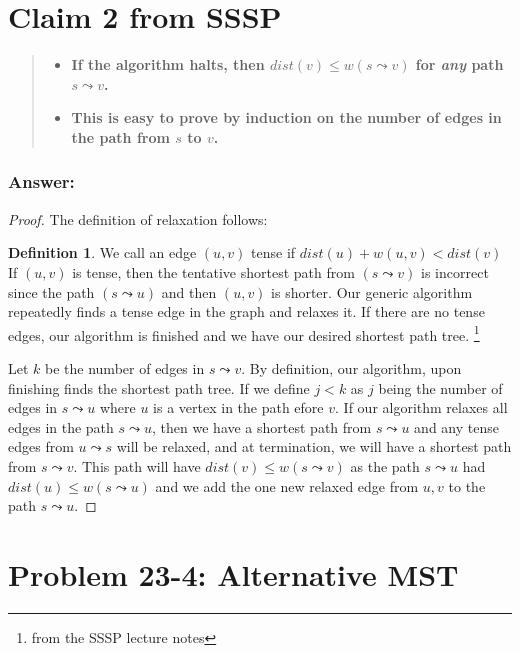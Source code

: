 \documentclass[titlepage]{article}
\theoremstyle{definition}
\newtheorem{definition}{Definition}[section]
\begin{document}
\section{Claim 2 from SSSP}
\begin{quote}
\begin{itemize}
  \item \textbf{ If the algorithm halts, then $dist(v) \leq w(s \leadsto v)$
	  for \emph{any} path $s \leadsto v$.}
  \item \textbf{This is easy to prove by induction on the number of edges in
	the path from $s$ to $v$.}
\end{itemize}
\end{quote}
\subsubsection{Answer:}

\begin{proof}
  The definition of relaxation follows:
  \begin{definition}
    We call an edge $(u, v)$ tense if $dist(u) + w(u, v) < dist(v)$ If $(u, v)$
    is tense, then the tentative shortest path from $(s \leadsto v )$ is
    incorrect since the path $(s \leadsto u)$ and then $(u, v)$ is shorter. Our
    generic algorithm repeatedly finds a tense edge in the graph and relaxes
    it. If there are no tense edges, our algorithm is finished and we have our
    desired shortest path tree. \footnote{from the SSSP lecture notes}
  \end{definition}

  Let $k$ be the number of edges in $s \leadsto v$. By definition, our
  algorithm, upon finishing finds the shortest path tree. If we define $j < k$
  as $j$ being the number of edges in $s \leadsto u$ where $u$ is a vertex in
  the path efore $v$. If our algorithm relaxes all edges in the path $s
  \leadsto u$, then we have a shortest path from $s \leadsto u$ and any tense
  edges from $u \leadsto s$ will be relaxed, and at termination, we will have a
  shortest path from $s \leadsto v$. This path will have $dist(v) \leq w(s
  \leadsto v)$ as the path $s \leadsto u$ had $dist(u) \leq w(s \leadsto u)$
  and we add the one new relaxed edge from $u,v$ to the path $s\leadsto u$. 
\end{proof}


\section{Problem 23-4: Alternative MST}
\end{document}
